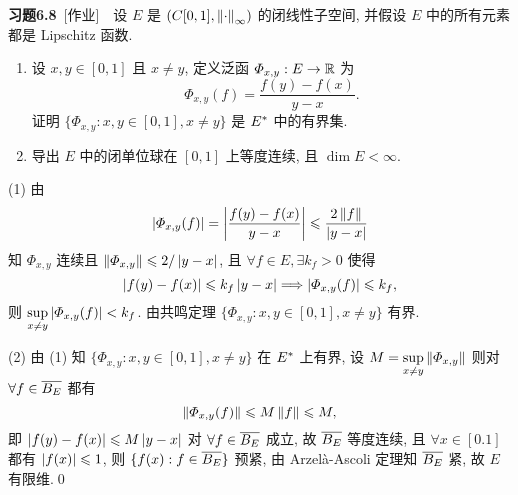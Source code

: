 	\textbf{习题6.8}\ [作业]\ \ 设 $ E $ 是 $ (C[0, 1], \norm{\cdot}_{\infty}) $ 的闭线性子空间, 并假设 $ E $ 中的所有元素都是 Lipschitz 函数.
	\begin{enumerate}[(1)]
		\item 设 $ x, y\in[0, 1] $ 且 $ x\ne y $, 定义泛函 $ \varPhi_{x, y}:E\to\R $ 为
		\[
			\varPhi_{x, y}(f)=\frac{f(y)-f(x)}{y-x}.
		\]
		证明 $\{ \varPhi_{x, y}:x, y\in[0, 1], x\ne y \}$ 是 $ \Star{E} $ 中的有界集.
		\item 导出 $ E $ 中的闭单位球在 $ [0, 1] $ 上等度连续, 且 $ \dim E<\infty $.
	\end{enumerate}
	\begin{Proof}
		(1) 由
		\[
			\abs{\varPhi_{x, y}(f)}=\abs{\frac{f(y)-f(x)}{y-x}}\leqslant\frac{2\norm{f}}{\abs{y-x}}
		\]
		知 $ \varPhi_{x, y} $ 连续且 $ \norm{\varPhi_{x, y}}\leqslant2/\abs{y-x} $, 且 $ \forall f\in E, \exists k_{f}>0 $ 使得
		\[
			\abs{f(y)-f(x)}\leqslant k_{f}\abs{y-x}\Longrightarrow \abs{\varPhi_{x, y}(f)}\leqslant k_{f},
		\]
		则 $\sup\limits_{x\ne y}\abs{\varPhi_{x, y}(f)}<k_{f} $. 由共鸣定理 $\{ \varPhi_{x, y}:x, y\in[0, 1], x\ne y \}$ 有界.

		(2) 由 (1) 知 $\{ \varPhi_{x, y}:x, y\in[0, 1], x\ne y \}$ 在 $ \Star{E} $ 上有界, 设 $ M=\sup\limits_{x\ne y}\norm{\varPhi_{x, y}} $ 则对 $ \forall f\in\baro{B_{E}} $ 都有
		\[
			\norm{\varPhi_{x, y}(f)}\leqslant M\norm{f}\leqslant M,
		\]
		即 $ \abs{f(y)-f(x)}\leqslant M\abs{y-x} $ 对 $ \forall f\in\baro{B_{E}} $ 成立, 故 $ \baro{B_{E}} $ 等度连续, 且 $ \forall x\in[0. 1] $ 都有 $ \abs{f(x)}\leqslant 1 $, 则 $ \{ f(x):f\in\baro{B_{E}} \} $ 预紧, 由 Arzel\`a-Ascoli 定理知 $ \baro{B_{E}} $ 紧, 故 $ E $ 有限维.\qed
	\end{Proof}

